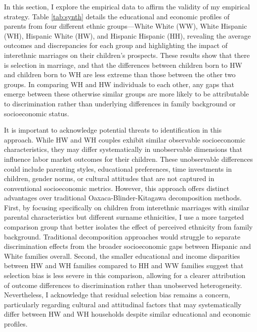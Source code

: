In this section, I explore the empirical data to affirm the validity of my empirical strategy. Table \ref{tab:synth} details the educational and economic profiles of parents from four different ethnic groups—White White (WW), White Hispanic (WH), Hispanic White (HW), and Hispanic Hispanic (HH), revealing the average outcomes and discrepancies for each group and highlighting the impact of interethnic marriages on their children’s prospects. These results show that there is selection in marriage, and that the differences between children born to HW and children born to WH are less extreme than those between the other two groups. In comparing WH and HW individuals to each other, any gaps that emerge between these otherwise similar groups are more likely to be attributable to discrimination rather than underlying differences in family background or socioeconomic status.

It is important to acknowledge potential threats to identification in this approach. While HW and WH couples exhibit similar observable socioeconomic characteristics, they may differ systematically in unobservable dimensions that influence labor market outcomes for their children. These unobservable differences could include parenting styles, educational preferences, time investments in children, gender norms, or cultural attitudes that are not captured in conventional socioeconomic metrics. However, this approach offers distinct advantages over traditional Oaxaca-Blinder-Kitagawa decomposition methods. First, by focusing specifically on children from interethnic marriages with similar parental characteristics but different surname ethnicities, I use a more targeted comparison group that better isolates the effect of perceived ethnicity from family background. Traditional decomposition approaches would struggle to separate discrimination effects from the broader socioeconomic gaps between Hispanic and White families overall. Second, the smaller educational and income disparities between HW and WH families compared to HH and WW families suggest that selection bias is less severe in this comparison, allowing for a clearer attribution of outcome differences to discrimination rather than unobserved heterogeneity. Nevertheless, I acknowledge that residual selection bias remains a concern, particularly regarding cultural and attitudinal factors that may systematically differ between HW and WH households despite similar educational and economic profiles.

